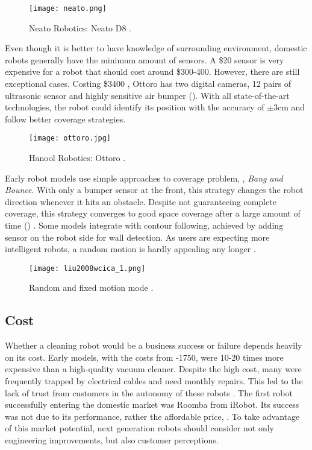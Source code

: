 \begin{figure}[!htb]
	\centering
	\texttt{[image: neato.png]}
	\caption{Neato Robotics: Neato D8 \cite{neato}.}
	\label{fig:neato}
\end{figure}

Even though it is better to have knowledge of surrounding environment, domestic robots generally have the minimum amount of sensors. A \$20 sensor is very expensive for a robot that should cost around \$300-400. However, there are still exceptional cases. Costing \$3400 , Ottoro has two digital cameras, 12 pairs of ultrasonic sensor and highly sensitive air bumper (). With all state-of-the-art technologies, the robot could identify its position with the accuracy of $\pm$3cm and follow better coverage strategies. \cite{siciliano2016}

\begin{figure}[!htb]
	\centering
	\texttt{[image: ottoro.jpg]}
	\caption{Hanool Robotics: Ottoro \cite{ottoro}.}
	\label{fig:ottoro}
\end{figure}

Early robot models use simple approaches to coverage problem, \ie, \textit{Bang and Bounce}. With only a bumper sensor at the front, this strategy changes the robot direction whenever it hits an obstacle. Despite not guaranteeing complete coverage, this strategy converges to good space coverage after a large amount of time () \cite{liu2008wcica}. Some models integrate with contour following, achieved by adding sensor on the robot side for wall detection. As users are expecting more intelligent robots, a random motion is hardly appealing any longer \cite{goel2013iros}.

\begin{figure}[!htb]
	\centering
	\texttt{[image: liu2008wcica\_1.png]}
	\caption{Random and fixed motion mode \cite{liu2008wcica}.}
	\label{fig:liu2008wcica_1}
\end{figure}

\subsection{Cost}
Whether a cleaning robot would be a business success or failure depends heavily on its cost. Early models, with the costs from -1750, were 10-20 times more expensive than a high-quality vacuum cleaner. Despite the high cost, many were frequently trapped by electrical cables and need monthly repairs. This led to the lack of trust from customers in the autonomy of these robots \cite{vaussard2014ras}. The first robot successfully entering the domestic market was Roomba from iRobot. Its success was not due to its performance, rather the affordable price, \ie {}. To take advantage of this market potential, next generation robots should consider not only engineering improvements, but also customer perceptions. \cite{gutmann2012arso, royakkers2015ijsr, siciliano2016}

